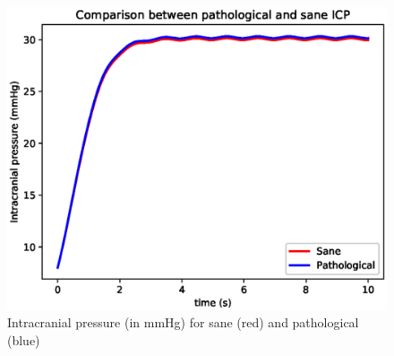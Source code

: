 \documentclass{config}
\begin{document}
\begin{figure}[H]
\centering
\includegraphics[scale=0.55]{icp_patho.eps}
\caption{Intracranial pressure (in mmHg) for sane (red) and pathological (blue)}
\end{figure}

\nocite{*}


\end{document}
